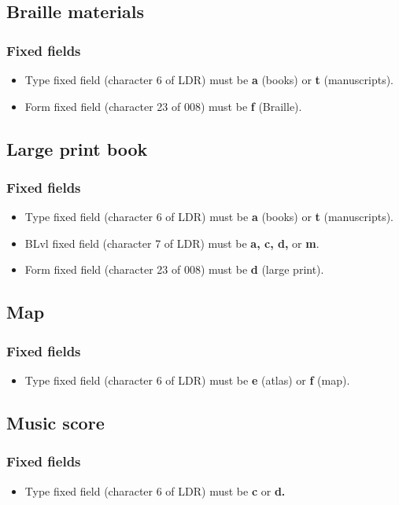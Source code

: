 \documentclass[a4paper,10pt]{amsart}
\begin{document}
\subsection{Braille materials}
\subsubsection*{Fixed fields}
\begin{itemize}
 \item Type fixed field (character 6 of LDR) must be {\bf a} (books) or {\bf t} (manuscripts).
 \item Form fixed field (character 23 of 008) must be {\bf f} (Braille).
\end{itemize}

\subsection{Large print book}
\subsubsection*{Fixed fields}
\begin{itemize}
 \item Type fixed field (character 6 of LDR) must be {\bf a} (books) or {\bf t} (manuscripts).
 \item BLvl fixed field (character 7 of LDR) must be {\bf a, c, d,} or {\bf m}.
 \item Form fixed field (character 23 of 008) must be {\bf d} (large print).
\end{itemize}

\subsection{Map}
\subsubsection*{Fixed fields}
\begin{itemize}
 \item Type fixed field (character 6 of LDR) must be {\bf e} (atlas) or {\bf f} (map).
\end{itemize}

\subsection{Music score}
\subsubsection*{Fixed fields}
\begin{itemize}
 \item Type fixed field (character 6 of LDR) must be {\bf c} or {\bf d.}
\end{itemize}
\end{document}
